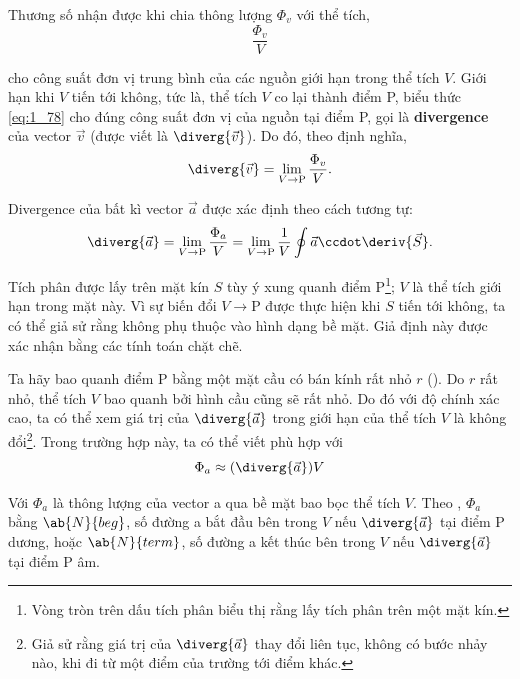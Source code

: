 Thương số nhận được khi chia thông lượng $\Phi_v$ với thể tích,
\begin{equation}\label{eq:1_78}
	\frac{\Phi_v}{V}
\end{equation}

\noindent
cho công suất đơn vị trung bình của các nguồn giới hạn trong thể tích $V$. Giới hạn khi $V$ tiến tới không, tức là, thể tích $V$ co lại thành điểm P, biểu thức \eqref{eq:1_78} cho đúng công suất đơn vị của nguồn tại điểm P, gọi là \textbf{divergence} của vector $\vec{v}$ (được viết là $\diverg{\vec{v}}$). Do đó, theo định nghĩa,
\begin{equation*}
	\diverg{\vec{v}} = \lim_{V\to \text{P}} \frac{\Phi_v}{V}.
\end{equation*}

\noindent
Divergence của bất kì vector $\vec{a}$ được xác định theo cách tương tự:
\begin{equation}\label{eq:1_79}
	\diverg{\vec{a}} = \lim_{V\to \text{P}} \frac{\Phi_a}{V} = \lim_{V\to \text{P}} \frac{1}{V} \oint \vec{a} \ccdot \deriv{\vec{S}}.
\end{equation}

\noindent
Tích phân được lấy trên mặt kín $S$ tùy ý xung quanh điểm P\footnote{Vòng tròn trên dấu tích phân biểu thị rằng lấy tích phân trên một mặt kín.}; $V$ là thể tích giới hạn trong mặt này. Vì sự biến đổi $V\to$P được thực hiện khi $S$ tiến tới không, ta có thể giả sử rằng  không phụ thuộc vào hình dạng bề mặt. Giả định này được xác nhận bằng các tính toán chặt chẽ.

Ta hãy bao quanh điểm P bằng một mặt cầu có bán kính rất nhỏ $r$ (). Do $r$ rất nhỏ, thể tích $V$ bao quanh bởi hình cầu cũng sẽ rất nhỏ. Do đó với độ chính xác cao, ta có thể xem giá trị của $\diverg{\vec{a}}$ trong giới hạn của thể tích $V$ là không đổi\footnote{Giả sử rằng giá trị của $\diverg{\vec{a}}$ thay đổi liên tục, không có bước nhảy nào, khi đi từ một điểm của trường tới điểm khác.}. Trong trường hợp này, ta có thể viết phù hợp với  
\begin{equation*}
	\Phi_a \approx (\diverg{\vec{a}}) V
\end{equation*}

\noindent
Với $\Phi_a$ là thông lượng của vector a qua bề mặt bao bọc thể tích $V$. Theo , $\Phi_a$ bằng $\ab{N}{beg}$, số đường a bắt đầu bên trong $V$ nếu $\diverg{\vec{a}}$ tại điểm P dương, hoặc $\ab{N}{term}$, số đường a kết thúc bên trong $V$ nếu $\diverg{\vec{a}}$ tại điểm P âm.

